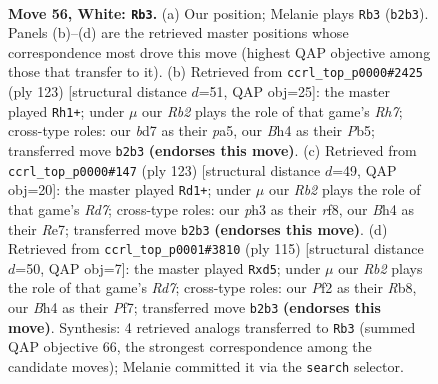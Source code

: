 \documentclass[11pt]{article}
\begin{document}
\clearpage

\begin{figure}[p]\centering
\begin{subfigure}{0.46\textwidth}\centering
\resizebox{\linewidth}{!}{%
\newchessgame
\chessboard[
  setfen={1R6/3b4/2r4k/1p6/rn4PB/4P2p/1R3P2/7K w - - 3 56},
  showmover=false,
  pgfstyle=straightmove, color=movearrow, markmove={b2-b3}
]}
\caption{}
\end{subfigure}\hfill
\begin{subfigure}{0.46\textwidth}\centering
\resizebox{\linewidth}{!}{%
\newchessgame
\chessboard[
  setfen={6k1/7p/p4R2/Pp1PpP2/5r2/8/2R4r/2K5 b - - 4 62},
  showmover=false,
  pgfstyle=straightmove, color=movearrow, markmove={h2-h1}
]}
\caption{}
\end{subfigure}
\\[4pt]
\begin{subfigure}{0.46\textwidth}\centering
\resizebox{\linewidth}{!}{%
\newchessgame
\chessboard[
  setfen={3R1R2/4r2k/1p5p/p7/2PBn1P1/8/3r4/6K1 b - - 7 62},
  showmover=false,
  pgfstyle=straightmove, color=movearrow, markmove={d2-d1}
]}
\caption{}
\end{subfigure}\hfill
\begin{subfigure}{0.46\textwidth}\centering
\resizebox{\linewidth}{!}{%
\newchessgame
\chessboard[
  setfen={1r6/5p2/5kp1/pB1P4/P7/1p6/3rR1K1/4R3 b - - 3 58},
  showmover=false,
  pgfstyle=straightmove, color=movearrow, markmove={d2-d5}
]}
\caption{}
\end{subfigure}
\caption{\textbf{Move 56, White: \texttt{Rb3}.} (a) Our position; Melanie plays \texttt{Rb3} (\texttt{b2b3}). Panels (b)--(d) are the retrieved master positions whose correspondence most drove this move (highest QAP objective among those that transfer to it). (b) Retrieved from \texttt{ccrl\_top\_p0000\#2425} (ply 123) [structural distance $d$=51, QAP obj=25]: the master played \texttt{Rh1+}; under $\mu$ our \emph{Rb2} plays the role of that game's \emph{Rh7}; cross-type roles: our \emph{b}d7 as their \emph{p}a5, our \emph{B}h4 as their \emph{P}b5; transferred move \texttt{b2b3} \textbf{(endorses this move)}. (c) Retrieved from \texttt{ccrl\_top\_p0000\#147} (ply 123) [structural distance $d$=49, QAP obj=20]: the master played \texttt{Rd1+}; under $\mu$ our \emph{Rb2} plays the role of that game's \emph{Rd7}; cross-type roles: our \emph{p}h3 as their \emph{r}f8, our \emph{B}h4 as their \emph{R}e7; transferred move \texttt{b2b3} \textbf{(endorses this move)}. (d) Retrieved from \texttt{ccrl\_top\_p0001\#3810} (ply 115) [structural distance $d$=50, QAP obj=7]: the master played \texttt{Rxd5}; under $\mu$ our \emph{Rb2} plays the role of that game's \emph{Rd7}; cross-type roles: our \emph{P}f2 as their \emph{R}b8, our \emph{B}h4 as their \emph{P}f7; transferred move \texttt{b2b3} \textbf{(endorses this move)}. Synthesis: 4 retrieved analogs transferred to \texttt{Rb3} (summed QAP objective 66, the strongest correspondence among the candidate moves); Melanie committed it via the \texttt{search} selector.}
\label{fig:thought-m110}
\end{figure}
\end{document}

